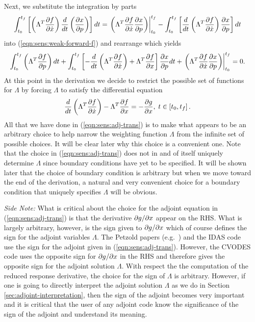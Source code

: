 \documentclass[pdf,ps2pdf,11pt]{SANDreport}
\begin{document}
Next, we substitute the integration by parts
%
\begin{equation}
\int_{t_0}^{t_f} \left[ \left( \Lambda^T \displaystyle{\frac{\partial f}{\partial \dot{x}}} \right) \frac{d}{dt}\left( \displaystyle{\frac{\partial x}{\partial p}} \right) \right] dt
= \left. \left( \Lambda^T \displaystyle{\frac{\partial f}{\partial \dot{x}}} \displaystyle{\frac{\partial x}{\partial p}} \right) \right|_{t_0}^{t_f}
- \int_{t_0}^{t_f} \left[ \frac{d}{dt}\left( \Lambda^T \displaystyle{\frac{\partial f}{\partial \dot{x}}} \right) \displaystyle{\frac{\partial x}{\partial p}} \right] dt
\end{equation}
%
into (\ref{eqn:sens:weak-forward-f}) and rearrange which yields
%
\begin{equation}
\int_{t_0}^{t_f} \left( \Lambda^T \displaystyle{\frac{\partial f}{\partial p}} \right) dt
+ \int_{t_0}^{t_f} \left[
    - \frac{d}{dt}\left( \Lambda^T \displaystyle{\frac{\partial f}{\partial \dot{x}}} \right)
    + \Lambda^T \displaystyle{\frac{\partial f}{\partial x}}
  \right] \displaystyle{\frac{\partial x}{\partial p}} dt
+ \left. \left( \Lambda^T \displaystyle{\frac{\partial f}{\partial \dot{x}}} \displaystyle{\frac{\partial x}{\partial p}} \right) \right|_{t_0}^{t_f}
= 0.
\label{eqn:sens:weak-forward-f-2}
\end{equation}
%
At this point in the derivation we decide to restrict the possible set of
functions for $\Lambda$ by forcing $\Lambda$ to satisfy the differential
equation
%
\begin{equation}
\frac{d}{dt}\left( \Lambda^T \displaystyle{\frac{\partial f}{\partial \dot{x}}} \right)
-  \Lambda^T \displaystyle{\frac{\partial f}{\partial x}} = - \displaystyle{\frac{\partial g}{\partial x}}, \; t \in \left[ t_0, t_f \right].
\label{eqn:sens:adj-trans}
\end{equation}
%
All that we have done in (\ref{eqn:sens:adj-trans}) is to make what appears to
be an arbitrary choice to help narrow the weighting function $\Lambda$ from
the infinite set of possible choices.  It will be clear later why this choice
is a convenient one.  Note that the choice in (\ref{eqn:sens:adj-trans}) does
not in and of itself uniquely determine $\Lambda$ since boundary conditions
have yet to be specified.  It will be shown later that the choice of boundary
condition is arbitrary but when we move toward the end of the derivation, a
natural and very convenient choice for a boundary condition that uniquely
specifies $\Lambda$ will be obvious.

{}\noindent\textit{Side Note:} What is critical about the choice for the
adjoint equation in (\ref{eqn:sens:adj-trans}) is that the derivative
$\partial g / \partial x$ appear on the RHS.  What is largely arbitrary, however, is the
sign given to $\partial g / \partial x$ which of course defines the sign for the
adjoint variables $\Lambda$.  The Petzold papers (e.g.\
{}\cite{adjoint-sens-2003}) and the IDAS code {}\cite{sundials} use the sign
for the adjoint given in (\ref{eqn:sens:adj-trans}).  However, the CVODES code
{}\cite{cvodes,sundials} uses the opposite sign for $\partial g / \partial x$ in the RHS
and therefore gives the opposite sign for the adjoint solution $\Lambda$.
With respect the the computation of the reduced response derivative, the
choice for the sign of $\Lambda$ is arbitrary.  However, if one is going to
directly interpret the adjoint solution $\Lambda$ as we do in Section
{}\ref{sec:adjoint-interpretation}, then the sign of the adjoint becomes very
important and it is critical that the user of any adjoint code know the
significance of the sign of the adjoint and understand its meaning.
\end{document}
